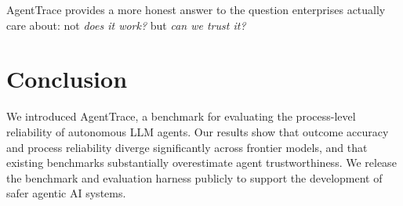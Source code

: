 \documentclass[11pt]{article}
\begin{document}
AgentTrace provides a more honest answer to the question enterprises actually care about: not \textit{does it work?} but \textit{can we trust it?}

\section{Conclusion}

We introduced AgentTrace, a benchmark for evaluating the process-level reliability of autonomous LLM agents. Our results show that outcome accuracy and process reliability diverge significantly across frontier models, and that existing benchmarks substantially overestimate agent trustworthiness. We release the benchmark and evaluation harness publicly to support the development of safer agentic AI systems.
\end{document}
